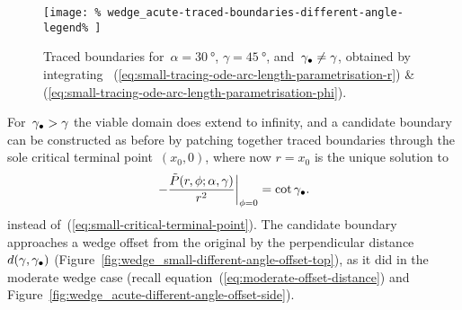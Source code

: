 \begin{figure}
  \newcommand*{\subfigurewidth}{0.4\textwidth}
  \centering
  \texttt{[image: \%
    wedge\_acute-traced-boundaries-different-angle-legend\%
  ]}
  \hspace*{\fill}
  \begin{subfigure}[t]{\subfigurewidth}
  \end{subfigure}
    \hfill
  \begin{subfigure}[t]{\subfigurewidth}
  \end{subfigure}
  \hspace*{\fill}
  \caption{
    Traced boundaries for~$\alpha = \SI{30}{\degree}$,
    $\gamma = \SI{45}{\degree}$, and~$\gamma_\bullet \ne \gamma$,
    obtained by integrating~%
      (\ref{eq:small-tracing-ode-arc-length-parametrisation-r})
    \&~%
      (\ref{eq:small-tracing-ode-arc-length-parametrisation-phi}).
  }
  \label{fig:wedge_small-traced-boundaries-different-angle}
\end{figure}

For~$\gamma_\bullet > \gamma$ the viable domain does extend to infinity,
and a candidate boundary can be constructed as before
by patching together traced boundaries through
the sole critical terminal point~$(x_0, 0)$,
where now $r = x_0$ is the unique solution to
\begin{equation}
  \eval*{
    -\frac{\desing{P}(r, \phi; \alpha, \gamma)}{r^2}
  }_{\phi=0}
    = \cot\gamma_\tr.
  \label{eq:small-critical-terminal-point-different-angle}
\end{equation}
instead of~(\ref{eq:small-critical-terminal-point}).
The candidate boundary approaches a wedge offset from the original
by the perpendicular distance~$d (\gamma, \gamma_\bullet)$
(Figure~\ref{fig:wedge_small-different-angle-offset-top}),
as it did in the moderate wedge case
(recall equation~(\ref{eq:moderate-offset-distance})
and Figure~\ref{fig:wedge_acute-different-angle-offset-side}).

\begin{figure}
\end{figure}

